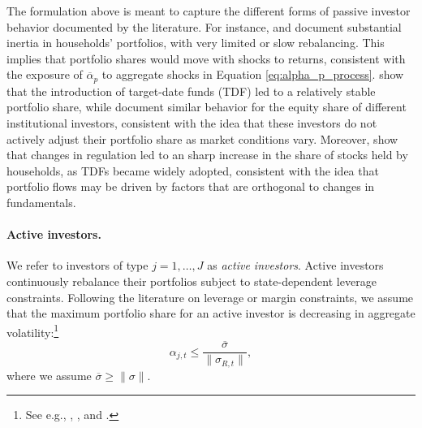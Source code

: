 The formulation above is meant to capture the different forms of passive investor behavior documented by the literature. 
For instance, \citet{ameriks2011household} and \citet{brunnermeier2008wealth} document substantial inertia in households' portfolios, with very limited or slow rebalancing. This implies that portfolio shares would move with shocks to returns, consistent with the exposure of $\overline{\alpha}_p$ to aggregate shocks in Equation \eqref{eq:alpha_p_process}. 
\citet{parker2020retail} show that the introduction of target-date funds (TDF) led to a relatively stable portfolio share, while \citet{gabaix2020search} document similar behavior for the equity share of different institutional investors, consistent with the idea that these investors do not actively adjust their portfolio share as market conditions vary.
Moreover, \citet{parker2022household} show that changes in regulation led to an sharp increase in the share of stocks held by households, as TDFs became widely adopted, consistent with the idea that portfolio flows may be driven by factors that are orthogonal to changes in fundamentals. 





\paragraph{Active investors.} We refer to investors of type $j = 1,\ldots, J$ as \textit{active investors}. Active investors continuously rebalance their portfolios subject to state-dependent leverage constraints. Following the literature on leverage or margin constraints, we assume that the maximum portfolio share for an active investor is decreasing in aggregate volatility:\footnote{See e.g., \citet{brunnermeier2009market}, \citet{garleanu2011margin}, and \citet{adrian2014procyclical}.}
\begin{equation}\label{eq:leverage_constraint}
    \alpha_{j,t} \leq \frac{\overline{\sigma}}{\|\sigma_{R,t}\|},
\end{equation}
where we assume $\overline{\sigma} \geq \|\sigma\|$.

